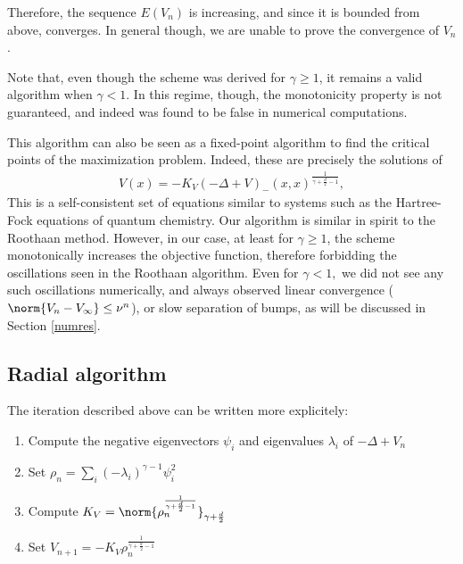 \documentclass[10pt,a4paper,reqno]{amsart}
\begin{document}
Therefore, the sequence $E(V_{n})$ is increasing, and since it is
bounded from above, converges. In general though, we are unable to
prove the convergence of $V_{n}$.

Note that, even though the scheme was derived for $\gamma \geq 1$, it
remains a valid algorithm when $\gamma < 1$. In this regime, though,
the monotonicity property is not guaranteed, and indeed was found to
be false in numerical computations.

This algorithm can also be seen as a fixed-point algorithm to find the
critical points of the maximization problem. Indeed, these are
precisely the solutions of
\begin{align*}
  V(x) = -K_{V} (-\Delta+V)_{-}(x,x)^{\frac 1 {\gamma + \frac d 2 - 1}},
\end{align*}
This is a self-consistent set of equations similar to systems such as
the Hartree-Fock equations of quantum chemistry. Our algorithm is
similar in spirit to the Roothaan method\cite{roothaan1951}. However,
in our case, at least for $\gamma \geq 1$, the scheme monotonically
increases the objective function, therefore forbidding the
oscillations seen in the Roothaan algorithm. Even for $\gamma < 1,$ we
did not see any such oscillations numerically, and always observed
linear convergence (\ie $\norm{V_{n} - V_{\infty}} \leq \nu^{n}$), or
slow separation of bumps, as will be discussed in Section
\ref{numres}.


\subsection{Radial algorithm}
The iteration described above can be written more explicitely:
\begin{enumerate}
\item Compute the negative eigenvectors $\psi_{i}$ and eigenvalues
  $\lambda_{i}$ of $-\Delta + V_{n}$
\item Set $\rho_{n} = \sum_{i} (-\lambda_{i})^{\gamma-1} \psi_{i}^{2}$
\item Compute $K_{V} = \norm{\rho_{n}^{\frac 1 {\gamma + \frac d 2 - 1}}}_{\gamma+\frac d 2}$
\item Set $V_{n+1} = - K_{V} \rho_{n}^{\frac 1 {\gamma + \frac d 2 - 1}}$
\end{enumerate}
\end{document}
